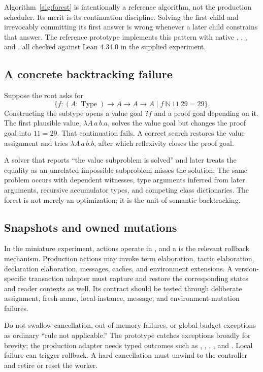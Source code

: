 Algorithm~\ref{alg:forest} is intentionally a reference algorithm, not the production scheduler. Its merit is its continuation discipline. Solving the first child and irrevocably committing its first answer is wrong whenever a later child constrains that answer. The reference prototype implements this pattern with native , , , and , all checked against Lean 4.34.0 in the supplied experiment.

\subsection{A concrete backtracking failure}

Suppose the root asks for
\[
 \{f:(A:\operatorname{Type})\to A\to A\to A\mid f\ \mathbb N\ 11\ 29=29\}.
\]
Constructing the subtype opens a value goal $?f$ and a proof goal depending on it. The first plausible value, $\lambda A\,a\,b.a$, solves the value goal but changes the proof goal into $11=29$. That continuation fails. A correct search restores the value assignment and tries $\lambda A\,a\,b.b$, after which reflexivity closes the proof goal.

A solver that reports ``the value subproblem is solved'' and later treats the equality as an unrelated impossible subproblem misses the solution. The same problem occurs with dependent witnesses, type arguments inferred from later arguments, recursive accumulator types, and competing class dictionaries. The forest is not merely an optimization; it is the unit of semantic backtracking.

\subsection{Snapshots and owned mutations}

In the miniature experiment, actions operate in , and a  is the relevant rollback mechanism. Production actions may invoke term elaboration, tactic elaboration, declaration elaboration, messages, caches, and environment extensions. A version-specific transaction adapter must capture and restore the corresponding states and reader contexts as well. Its contract should be tested through deliberate assignment, fresh-name, local-instance, message, and environment-mutation failures.

Do not swallow cancellation, out-of-memory failures, or global budget exceptions as ordinary ``rule not applicable.'' The prototype catches exceptions broadly for brevity; the production adapter needs typed outcomes such as , , , , and . Local failure can trigger rollback. A hard cancellation must unwind to the controller and retire or reset the worker.

